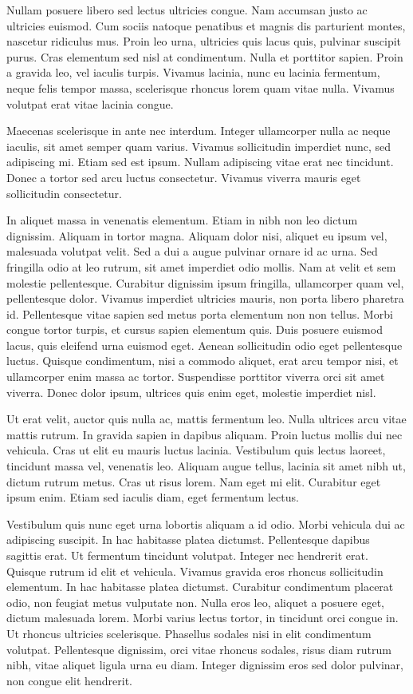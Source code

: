 \documentclass[journal]{IEEEtran}
\begin{document}
Nullam posuere libero sed lectus ultricies congue. Nam accumsan justo ac ultricies euismod. Cum sociis natoque penatibus et magnis dis parturient montes, nascetur ridiculus mus. Proin leo urna, ultricies quis lacus quis, pulvinar suscipit purus. Cras elementum sed nisl at condimentum. Nulla et porttitor sapien. Proin a gravida leo, vel iaculis turpis. Vivamus lacinia, nunc eu lacinia fermentum, neque felis tempor massa, scelerisque rhoncus lorem quam vitae nulla. Vivamus volutpat erat vitae lacinia congue.

Maecenas scelerisque in ante nec interdum. Integer ullamcorper nulla ac neque iaculis, sit amet semper quam varius. Vivamus sollicitudin imperdiet nunc, sed adipiscing mi. Etiam sed est ipsum. Nullam adipiscing vitae erat nec tincidunt. Donec a tortor sed arcu luctus consectetur. Vivamus viverra mauris eget sollicitudin consectetur.

In aliquet massa in venenatis elementum. Etiam in nibh non leo dictum dignissim. Aliquam in tortor magna. Aliquam dolor nisi, aliquet eu ipsum vel, malesuada volutpat velit. Sed a dui a augue pulvinar ornare id ac urna. Sed fringilla odio at leo rutrum, sit amet imperdiet odio mollis. Nam at velit et sem molestie pellentesque. Curabitur dignissim ipsum fringilla, ullamcorper quam vel, pellentesque dolor. Vivamus imperdiet ultricies mauris, non porta libero pharetra id. Pellentesque vitae sapien sed metus porta elementum non non tellus. Morbi congue tortor turpis, et cursus sapien elementum quis. Duis posuere euismod lacus, quis eleifend urna euismod eget. Aenean sollicitudin odio eget pellentesque luctus. Quisque condimentum, nisi a commodo aliquet, erat arcu tempor nisi, et ullamcorper enim massa ac tortor. Suspendisse porttitor viverra orci sit amet viverra. Donec dolor ipsum, ultrices quis enim eget, molestie imperdiet nisl.

Ut erat velit, auctor quis nulla ac, mattis fermentum leo. Nulla ultrices arcu vitae mattis rutrum. In gravida sapien in dapibus aliquam. Proin luctus mollis dui nec vehicula. Cras ut elit eu mauris luctus lacinia. Vestibulum quis lectus laoreet, tincidunt massa vel, venenatis leo. Aliquam augue tellus, lacinia sit amet nibh ut, dictum rutrum metus. Cras ut risus lorem. Nam eget mi elit. Curabitur eget ipsum enim. Etiam sed iaculis diam, eget fermentum lectus.

Vestibulum quis nunc eget urna lobortis aliquam a id odio. Morbi vehicula dui ac adipiscing suscipit. In hac habitasse platea dictumst. Pellentesque dapibus sagittis erat. Ut fermentum tincidunt volutpat. Integer nec hendrerit erat. Quisque rutrum id elit et vehicula. Vivamus gravida eros rhoncus sollicitudin elementum. In hac habitasse platea dictumst. Curabitur condimentum placerat odio, non feugiat metus vulputate non. Nulla eros leo, aliquet a posuere eget, dictum malesuada lorem. Morbi varius lectus tortor, in tincidunt orci congue in. Ut rhoncus ultricies scelerisque. Phasellus sodales nisi in elit condimentum volutpat. Pellentesque dignissim, orci vitae rhoncus sodales, risus diam rutrum nibh, vitae aliquet ligula urna eu diam. Integer dignissim eros sed dolor pulvinar, non congue elit hendrerit.
\end{document}
